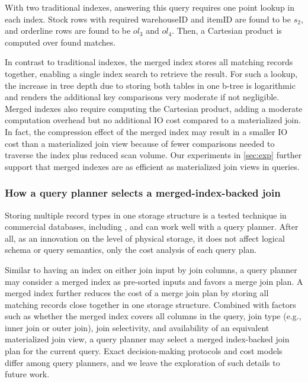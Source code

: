 \documentclass[biblatex, english]{lni}
\begin{document}
With two traditional indexes, answering this query requires one point lookup in each index.
Stock rows with required warehouseID and itemID are found to be \(s_2\), and orderline rows are found to be \(ol_3\) and \(ol_4\).
Then, a Cartesian product is computed over found matches.

In contrast to traditional indexes, the merged index stores all matching records together, enabling a single index search to retrieve the result.
For such a lookup, the increase in tree depth due to storing both tables in one b-tree is logarithmic and renders the additional key comparisons very moderate if not negligible.
Merged indexes also require computing the Cartesian product, adding a moderate computation overhead but no additional IO cost compared to a materialized join.
In fact, the compression effect of the merged index may result in a smaller IO cost than a materialized join view because of fewer comparisons needed to traverse the index plus reduced scan volume.
Our experiments in \cref{sec:exp} further support that merged indexes are as efficient as materialized join views in queries.

\subsubsection{How a query planner selects a merged-index-backed join}

Storing multiple record types in one storage structure is a tested technique in commercial databases, including \citet{oracle-table-cluster,Google-Spanner}, and can work well with a query planner.
After all, as an innovation on the level of physical storage, it does not affect logical schema or query semantics, only the cost analysis of each query plan.

Similar to having an index on either join input by join columns, a query planner may consider a merged index as pre-sorted inputs and favors a merge join plan.
A merged index further reduces the cost of a merge join plan by storing all matching records close together in one storage structure.
Combined with factors such as whether the merged index covers all columns in the query, join type (e.g., inner join or outer join), join selectivity, and availability of an equivalent materialized join view, a query planner may select a merged index-backed join plan for the current query.
Exact decision-making protocols and cost models differ among query planners, and we leave the exploration of such details to future work.
\end{document}
